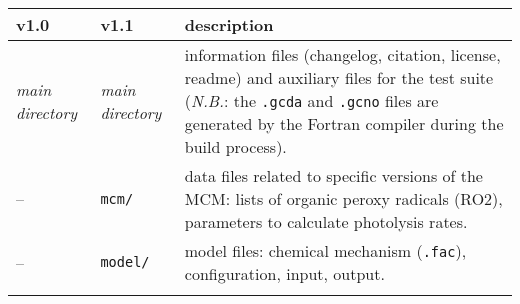 \begin{longtable}[]{@{}lll@{}}
\begin{minipage}[b]{0.20\columnwidth}\raggedright
v1.0\strut
\end{minipage} & \begin{minipage}[b]{0.24\columnwidth}\raggedright
v1.1\strut
\end{minipage} & \begin{minipage}[b]{0.48\columnwidth}\raggedright
description\strut
\end{minipage}\tabularnewline
\endhead
\begin{minipage}[t]{0.20\columnwidth}\raggedright
\emph{main directory}\strut
\end{minipage} & \begin{minipage}[t]{0.24\columnwidth}\raggedright
\emph{main directory}\strut
\end{minipage} & \begin{minipage}[t]{0.48\columnwidth}\raggedright
information files (changelog, citation, license, readme) and auxiliary
files for the test suite (\emph{N.B.}: the \texttt{.gcda} and
\texttt{.gcno} files are generated by the Fortran compiler during the
build process).\strut
\end{minipage}\tabularnewline
\begin{minipage}[t]{0.20\columnwidth}\raggedright
--\strut
\end{minipage} & \begin{minipage}[t]{0.24\columnwidth}\raggedright
\texttt{mcm/}\strut
\end{minipage} & \begin{minipage}[t]{0.48\columnwidth}\raggedright
data files related to specific versions of the MCM: lists of organic
peroxy radicals (RO2), parameters to calculate photolysis rates.\strut
\end{minipage}\tabularnewline
\begin{minipage}[t]{0.20\columnwidth}\raggedright
--\strut
\end{minipage} & \begin{minipage}[t]{0.24\columnwidth}\raggedright
\texttt{model/}\strut
\end{minipage} & \begin{minipage}[t]{0.48\columnwidth}\raggedright
model files: chemical mechanism (\texttt{.fac}), configuration, input,
output.\strut
\end{minipage}\tabularnewline
\begin{minipage}[t]{0.20\columnwidth}\raggedright

\end{minipage}
\end{longtable}
